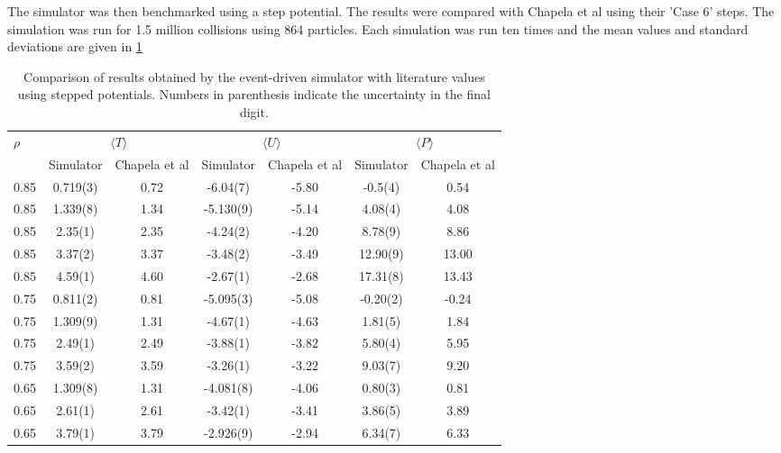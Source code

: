 \documentclass[12pt]{UoAthesis}
\begin{document}
The simulator was then benchmarked using a step potential.  The
results were compared with Chapela et al \cite{Chapela1989} using
their 'Case 6' steps. The simulation was run for 1.5 million
collisions using 864 particles. Each simulation was run ten times and
the mean values and standard deviations are given in
\ref{tab:benchsoft}
\begin{table}
  \caption{Comparison of results obtained by the event-driven
    simulator with literature values using stepped potentials. Numbers
    in parenthesis indicate the uncertainty in the final
    digit. \label{tab:benchsoft}}
  \begin{center}
    \begin{tabular}{l c c c c c c}
      \toprule $\rho$ & \multicolumn{2}{c}{$\langle T\rangle$} &
      \multicolumn{2}{c}{$\langle U \rangle$} &
      \multicolumn{2}{c}{$\langle P \rangle$} \\
      \cmidrule(rl{0.75em}){2-3} 
      \cmidrule(rl{0.75em}){4-5}
      \cmidrule(rl{0.75em}){6-7} 
      & Simulator & Chapela et al & Simulator
      & Chapela et al & Simulator & Chapela et al\\
      \midrule 
      0.85 & 0.719(3) & 0.72 & -6.04(7) & -5.80 & -0.5(4) & 0.54 \\
      0.85 & 1.339(8) & 1.34 & -5.130(9) & -5.14 & 4.08(4) & 4.08 \\
      0.85 & 2.35(1) & 2.35 & -4.24(2) & -4.20 & 8.78(9) & 8.86 \\
      0.85 & 3.37(2) & 3.37 & -3.48(2) & -3.49 & 12.90(9) & 13.00 \\
      0.85 & 4.59(1) & 4.60 & -2.67(1) & -2.68 & 17.31(8) & 13.43 \\
      0.75 & 0.811(2) & 0.81 & -5.095(3) & -5.08 & -0.20(2) & -0.24 \\
      0.75 & 1.309(9) & 1.31 & -4.67(1) & -4.63 & 1.81(5) & 1.84 \\
      0.75 & 2.49(1) & 2.49 & -3.88(1) & -3.82 & 5.80(4) & 5.95 \\
      0.75 & 3.59(2) & 3.59 & -3.26(1) & -3.22 & 9.03(7) & 9.20 \\
      0.65 & 1.309(8) & 1.31 & -4.081(8) & -4.06 & 0.80(3) & 0.81 \\
      0.65 & 2.61(1) & 2.61 & -3.42(1) & -3.41 & 3.86(5) & 3.89 \\
      0.65 & 3.79(1) & 3.79 & -2.926(9) & -2.94 & 6.34(7) & 6.33  \\
      \bottomrule
    \end{tabular}
  \end{center}
\end{table}
\end{document}
